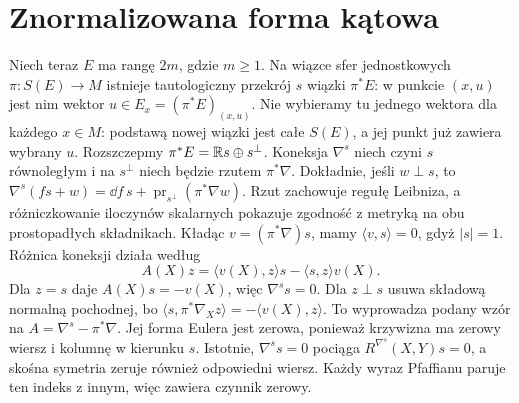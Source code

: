 \section{Znormalizowana forma kątowa}
\label{sec:angular-form-26}

Niech teraz $E$ ma rangę $2m$, gdzie $m\geq1$.
Na wiązce sfer jednostkowych
$\pi:S(E)\to M$ istnieje
tautologiczny przekrój $s$ wiązki
$\pi^*E$: w punkcie $(x,u)$
jest nim wektor $u\in E_x=(\pi^*E)_{(x,u)}$.
Nie wybieramy tu jednego wektora dla każdego $x\in M$:
podstawą nowej wiązki jest całe $S(E)$,
a jej punkt już zawiera wybrany $u$.
Rozszczepmy
$\pi^*E=\mathbb{R} s\oplus s^\perp$.
Koneksja $\nabla^s$ niech czyni
$s$ równoległym i na $s^\perp$
niech będzie rzutem $\pi^*\nabla$.
Dokładnie, jeśli $w\perp s$, to
$\nabla^s(fs+w)=\dd f\,s+\operatorname{pr}_{s^\perp}(\pi^*\nabla w)$.
Rzut zachowuje regułę Leibniza, a różniczkowanie iloczynów
skalarnych pokazuje zgodność z metryką na obu prostopadłych
składnikach. Kładąc $v=(\pi^*\nabla)s$, mamy $\langle v,s\rangle=0$,
gdyż $|s|=1$. Różnica koneksji działa według
\[
 A(X)z=\langle v(X),z\rangle s-\langle s,z\rangle v(X).
\]
Dla $z=s$ daje $A(X)s=-v(X)$, więc $\nabla^s s=0$.
Dla $z\perp s$ usuwa składową normalną pochodnej,
bo $\langle s,\pi^*\nabla_Xz\rangle=-\langle v(X),z\rangle$.
To wyprowadza podany wzór na $A=\nabla^s-\pi^*\nabla$.
Jej forma Eulera jest zerowa,
ponieważ krzywizna ma zerowy
wiersz i kolumnę w kierunku $s$.
Istotnie, $\nabla^s s=0$ pociąga $R^{\nabla^s}(X,Y)s=0$,
a skośna symetria zeruje również odpowiedni wiersz.
Każdy wyraz Pfaffianu paruje ten indeks z innym,
więc zawiera czynnik zerowy.


